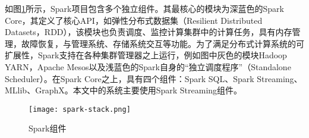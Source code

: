 如图\ref{fig:Spark组件}所示，Spark项目包含多个独立组件。其最核心的模块为深蓝色的Spark Core，其定义了核心API，如弹性分布式数据集（Resilient Distributed Datasets，RDD），该模块也负责调度、监控计算集群中的计算任务，具有内存管理，故障恢复，与管理系统、存储系统交互等功能。为了满足分布式计算系统的可扩展性，Spark支持在各种集群管理器之上运行，例如图中灰色的模块Hadoop YARN，Apache Mesos以及浅蓝色的Spark自身的“独立调度程序”（Standalone Scheduler）。在Spark Core之上，具有四个组件：Spark SQL、Spark Streaming、MLlib、GraphX。本文中的系统主要使用Spark Streaming组件。



\begin{figure}
  \centering
  \texttt{[image: spark-stack.png]}
  \caption{Spark组件}
  \label{fig:Spark组件}
\end{figure}




